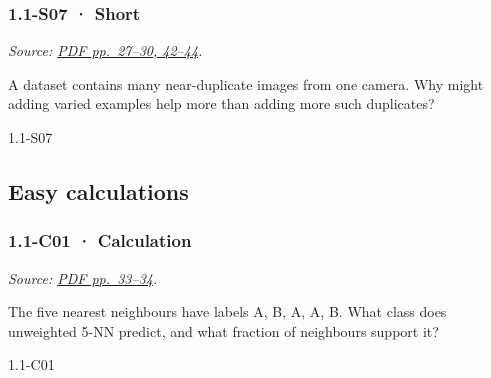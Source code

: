\noindent\begin{minipage}{\linewidth}

\subsubsection{1.1-S07 · Short}\label{s07-short}

\emph{Source:
\href{../Lecture\%20Slides/1.1.\%20Fundamentals.pdf\#page=27}{PDF
pp.~27--30, 42--44}.}

A dataset contains many near-duplicate images from one camera. Why might
adding varied examples help more than adding more such duplicates?

\begin{solution}[20mm]{1.1-S07}

\end{solution}
\end{minipage}\par\medskip

\subsection{Easy calculations}\label{easy-calculations}

\noindent\begin{minipage}{\linewidth}

\subsubsection{1.1-C01 · Calculation}\label{c01-calculation}

\emph{Source:
\href{../Lecture\%20Slides/1.1.\%20Fundamentals.pdf\#page=33}{PDF
pp.~33--34}.}

The five nearest neighbours have labels A, B, A, A, B. What class does
unweighted 5-NN predict, and what fraction of neighbours support it?

\begin{solution}[26mm]{1.1-C01}

\end{solution}
\end{minipage}\par\medskip

